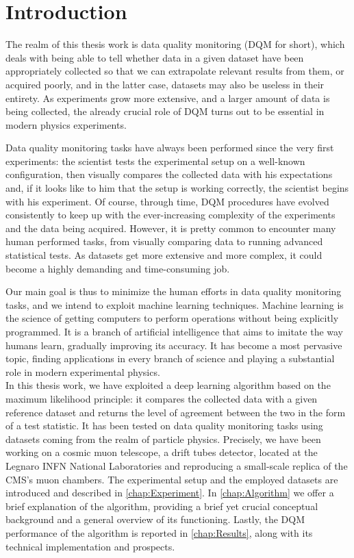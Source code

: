 \chapter*{Introduction}
 
\label{chap:Introduction}

The realm of this thesis work is data quality monitoring (DQM for short), which deals with being able to tell whether
data in a given dataset have been appropriately collected so that we can extrapolate relevant results from them, or acquired
poorly, and in the latter case, datasets may also be useless in their entirety. As experiments grow more extensive, and a larger
amount of data is being collected, the already crucial role of DQM turns out to be essential in modern physics
experiments. 

Data quality monitoring tasks have always been performed since the very first experiments: the scientist tests the
experimental setup on a well-known configuration, then visually compares the collected data with his expectations and,
if it looks like to him that the setup is working correctly, the scientist begins with his experiment. Of course,
through time, DQM procedures have evolved consistently to keep up with the ever-increasing complexity of the experiments
and the data being acquired. However, it is pretty common to encounter many human performed tasks, from visually
comparing data to running advanced statistical tests. As datasets get more extensive and more complex, it could become a
highly demanding and time-consuming job.  

Our main goal is thus to minimize the human efforts in data quality monitoring tasks, and we intend to exploit
machine learning techniques. Machine learning is the science of getting computers to perform operations without being
explicitly programmed. It is a branch of artificial intelligence that aims to imitate the way humans learn, gradually
improving its accuracy. It has become a most pervasive topic, finding applications in every branch of science and playing a substantial role in modern experimental physics. \\

In this thesis work, we have exploited a deep learning algorithm based on the maximum likelihood principle: it compares
the collected data with a given reference dataset and returns the level of agreement between the two in the form of a
test statistic. It has been tested on data quality monitoring tasks using datasets coming from the realm of particle
physics. Precisely, we have been working on a cosmic muon telescope, a drift tubes detector, located at the Legnaro INFN
National Laboratories and reproducing a small-scale replica of the CMS's muon chambers. The experimental setup and the
employed datasets are introduced and described in \autoref{chap:Experiment}. In \autoref{chap:Algorithm} we offer a
brief explanation of the algorithm, providing a brief yet crucial conceptual background and a general overview of its
functioning. Lastly, the DQM performance of the algorithm is reported in \autoref{chap:Results}, along with its
technical implementation and prospects. 




